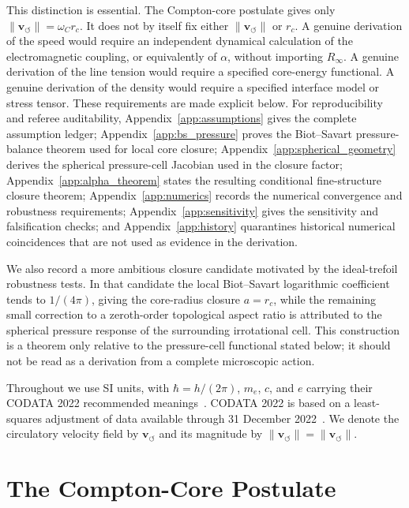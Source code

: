 \documentclass[aps,pra,preprint,longbibliography,nofootinbib]{revtex4-2}
\newcommand{\vnorm}{\lVert\mathbf{v}_{\!\boldsymbol{\circlearrowleft}}\rVert} %
\begin{document}
This distinction is essential.  The Compton-core postulate gives only
$\lVert \mathbf{v}_{\!\boldsymbol{\circlearrowleft}}\rVert=\omega_C r_c$.
It does not by itself fix either
$\lVert \mathbf{v}_{\!\boldsymbol{\circlearrowleft}}\rVert$ or $r_c$.
A genuine derivation of the speed would require an independent dynamical
calculation of the electromagnetic coupling, or equivalently of
$\alpha$, without importing $R_\infty$.  A genuine derivation of the line
tension would require a specified core-energy functional.  A genuine
derivation of the density would require a specified interface model or
stress tensor.  These requirements are made explicit below.  For reproducibility and
referee auditability, Appendix~\ref{app:assumptions} gives the complete
assumption ledger; Appendix~\ref{app:bs_pressure} proves the Biot--Savart
pressure-balance theorem used for local core closure;
Appendix~\ref{app:spherical_geometry} derives the spherical pressure-cell
Jacobian used in the closure factor; Appendix~\ref{app:alpha_theorem}
states the resulting conditional fine-structure closure theorem;
Appendix~\ref{app:numerics} records the numerical convergence and
robustness requirements; Appendix~\ref{app:sensitivity} gives the
sensitivity and falsification checks; and Appendix~\ref{app:history}
quarantines historical numerical coincidences that are not used as
evidence in the derivation.


We also record a more ambitious closure candidate motivated by the
ideal-trefoil robustness tests.  In that candidate the local
Biot--Savart logarithmic coefficient tends to $1/(4\pi)$, giving the
core-radius closure $a=r_c$, while the remaining small correction to a
zeroth-order topological aspect ratio is attributed to the spherical
pressure response of the surrounding irrotational cell.  This construction
is a theorem only relative to the pressure-cell functional stated below;
it should not be read as a derivation from a complete microscopic action.

Throughout we use SI units, with $\hbar=h/(2\pi)$, $m_e$, $c$, and $e$
carrying their CODATA 2022 recommended meanings~\cite{MohrTaylor2022}.
CODATA 2022 is based on a least-squares adjustment of data available
through 31 December 2022~\cite{MohrTaylor2022}.  We denote the
circulatory velocity field by $\mathbf{v}_{\!\boldsymbol{\circlearrowleft}}$
and its magnitude by
$\vnorm=\lVert \mathbf{v}_{\!\boldsymbol{\circlearrowleft}}\rVert$.

\section{The Compton-Core Postulate}
\label{sec:postulate}
\end{document}
